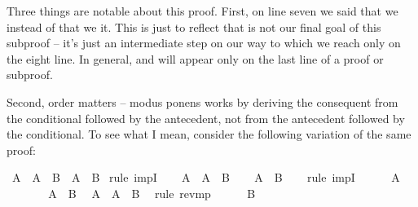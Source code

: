 \begin{isabellebody}
\isanewline
{}\isamarkupfalse%
%
\endisatagproof
{\isafoldproof}%
%
\isadelimproof
%
\endisadelimproof
%
\begin{isamarkuptext}%
Three things are notable about this proof. First, on line seven we said that we 
  instead of that we  it. This is just to reflect that 
is not our final goal of this subproof -- it's just an intermediate step on our way to 
which we reach only on the eight line. In general,  and  will appear only
on the last line of a proof or subproof.%
\end{isamarkuptext}\isamarkuptrue%
%
\begin{isamarkuptext}%
Second, order matters -- modus ponens works by deriving the consequent from the conditional 
followed by the antecedent, not from the antecedent followed by the conditional. To see what I mean,
consider the following variation of the same proof:%
\end{isamarkuptext}\isamarkuptrue%
\isamarkupfalse%
\ {\isachardoublequoteopen}{\isacharparenleft}A\ {\isasymlongrightarrow}\ A\ {\isasymlongrightarrow}\ B{\isacharparenright}\ {\isasymlongrightarrow}\ {\isacharparenleft}A\ {\isasymlongrightarrow}\ B{\isacharparenright}{\isachardoublequoteclose}\isanewline
%
\isadelimproof
%
\endisadelimproof
%
\isatagproof
{}\isamarkupfalse%
\ {\isacharparenleft}rule\ impI{\isacharparenright}\isanewline
\ \ \isamarkupfalse%
\ {\isachardoublequoteopen}A\ {\isasymlongrightarrow}\ A\ {\isasymlongrightarrow}\ B{\isachardoublequoteclose}\isanewline
\ \ \isamarkupfalse%
\ {\isachardoublequoteopen}A\ {\isasymlongrightarrow}\ B{\isachardoublequoteclose}\isanewline
\ \ \isamarkupfalse%
\ {\isacharparenleft}rule\ impI{\isacharparenright}\isanewline
\ \ \ \ \isamarkupfalse%
\ {\isachardoublequoteopen}A{\isachardoublequoteclose}\isanewline
\ \ \ \ \isamarkupfalse%
\ \isamarkupfalse%
\ {\isachardoublequoteopen}A\ {\isasymlongrightarrow}\ B{\isachardoublequoteclose}\ \isamarkupfalse%
\ {\isacharbackquoteopen}A\ {\isasymlongrightarrow}\ A\ {\isasymlongrightarrow}\ B{\isacharbackquoteclose}\ \isamarkupfalse%
\ {\isacharparenleft}rule\ rev{\isacharunderscore}mp{\isacharparenright}\isanewline
\ \ \ \ \isamarkupfalse%
\ {\isachardoublequoteopen}B{\isachardoublequoteclose}\ \isamarkupfalse%

\end{isabellebody}
